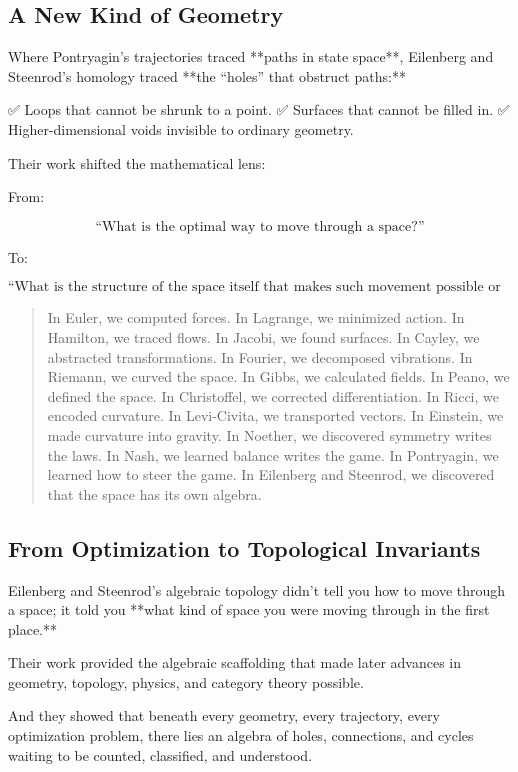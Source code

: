 \subsection*{A New Kind of Geometry}

Where Pontryagin’s trajectories traced **paths in state space**,  
Eilenberg and Steenrod’s homology traced **the “holes” that obstruct paths:**

✅ Loops that cannot be shrunk to a point.  
✅ Surfaces that cannot be filled in.  
✅ Higher-dimensional voids invisible to ordinary geometry.

Their work shifted the mathematical lens:

From:

\[
\boxed{\text{“What is the optimal way to move through a space?”}}
\]

To:

\[
\boxed{\text{“What is the structure of the space itself that makes such movement possible or impossible?”}}
\]

\bigskip

\begin{quote}
In Euler, we computed forces.  
In Lagrange, we minimized action.  
In Hamilton, we traced flows.  
In Jacobi, we found surfaces.  
In Cayley, we abstracted transformations.  
In Fourier, we decomposed vibrations.  
In Riemann, we curved the space.  
In Gibbs, we calculated fields.  
In Peano, we defined the space.  
In Christoffel, we corrected differentiation.  
In Ricci, we encoded curvature.  
In Levi-Civita, we transported vectors.  
In Einstein, we made curvature into gravity.  
In Noether, we discovered symmetry writes the laws.  
In Nash, we learned balance writes the game.  
In Pontryagin, we learned how to steer the game.  
In Eilenberg and Steenrod, we discovered that the space has its own algebra.
\end{quote}

\subsection*{From Optimization to Topological Invariants}

Eilenberg and Steenrod’s algebraic topology didn’t tell you how to move through a space;  
it told you **what kind of space you were moving through in the first place.**

Their work provided the algebraic scaffolding that made later advances in geometry, topology, physics, and category theory possible.

And they showed that beneath every geometry, every trajectory, every optimization problem,  
there lies an algebra of holes, connections, and cycles  
waiting to be counted, classified, and understood.

